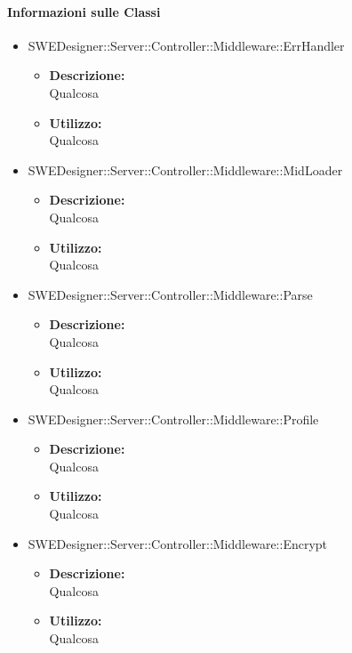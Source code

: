 		\paragraph{Informazioni sulle Classi}
		\begin{itemize}
			\item SWEDesigner::Server::Controller::Middleware::ErrHandler
			\begin{itemize}
				\item \textbf{Descrizione: }\\
				Qualcosa
				\item \textbf{Utilizzo: }\\
				Qualcosa
			\end{itemize}
			\item SWEDesigner::Server::Controller::Middleware::MidLoader
			\begin{itemize}
				\item \textbf{Descrizione: }\\
				Qualcosa
				\item \textbf{Utilizzo: }\\
				Qualcosa
			\end{itemize}
			\item SWEDesigner::Server::Controller::Middleware::Parse
			\begin{itemize}
				\item \textbf{Descrizione: }\\
				Qualcosa
				\item \textbf{Utilizzo: }\\
				Qualcosa
			\end{itemize}
			\item SWEDesigner::Server::Controller::Middleware::Profile
			\begin{itemize}
				\item \textbf{Descrizione: }\\
				Qualcosa
				\item \textbf{Utilizzo: }\\
				Qualcosa
			\end{itemize}
			\item SWEDesigner::Server::Controller::Middleware::Encrypt
			\begin{itemize}
				\item \textbf{Descrizione: }\\
				Qualcosa
				\item \textbf{Utilizzo: }\\
				Qualcosa
			\end{itemize}
		\end{itemize}		
	
